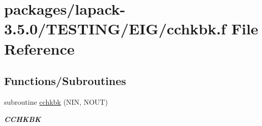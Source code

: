 \hypertarget{cchkbk_8f}{}\section{packages/lapack-\/3.5.0/\+T\+E\+S\+T\+I\+N\+G/\+E\+I\+G/cchkbk.f File Reference}
\label{cchkbk_8f}
\subsection*{Functions/\+Subroutines}
\begin{DoxyCompactItemize}
\item 
subroutine \hyperlink{group__complex__eig_gae73239f7fc944d68873460e586be5953}{cchkbk} (N\+I\+N, N\+O\+U\+T)
\begin{DoxyCompactList}\small\item\em {\bfseries C\+C\+H\+K\+B\+K} \end{DoxyCompactList}\end{DoxyCompactItemize}
